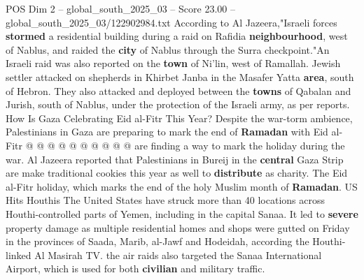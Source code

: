 \begin{textsample}{POS Dim 2 – global\_south\_2025\_03 – Score 23.00 – global\_south\_2025\_03/122902984.txt}
According to Al Jazeera,"Israeli forces \textbf{stormed} a residential building during a raid on Rafidia \textbf{neighbourhood}, west of Nablus, and raided the \textbf{city} of Nablus through the Surra checkpoint."An Israeli raid was also reported on the \textbf{town} of Ni'lin, west of Ramallah.
Jewish settler attacked on shepherds in Khirbet Janba in the Masafer Yatta \textbf{area}, south of Hebron.
They also attacked and deployed between the \textbf{towns} of Qabalan and Jurish, south of Nablus, under the protection of the Israeli army, as per reports.
How Is Gaza Celebrating Eid al-Fitr This Year?
Despite the war-torm ambience, Palestinians in Gaza are preparing to mark the end of \textbf{Ramadan} with Eid al-Fitr @ @ @ @ @ @ @ @ @ @ are finding a way to mark the holiday during the war.
Al Jazeera reported that Palestinians in Bureij in the \textbf{central} Gaza Strip are make traditional cookies this year as well to \textbf{distribute} as charity.
The Eid al-Fitr holiday, which marks the end of the holy Muslim month of \textbf{Ramadan}.
US Hits Houthis The United States have struck more than 40 locations across Houthi-controlled parts of Yemen, including in the capital Sanaa.
It led to \textbf{severe} property damage as multiple residential homes and shops were gutted on Friday in the provinces of Saada, Marib, al-Jawf and Hodeidah, according the Houthi-linked Al Masirah TV. the air raids also targeted the Sanaa International Airport, which is used for both \textbf{civilian} and military traffic.

\end{textsample}
